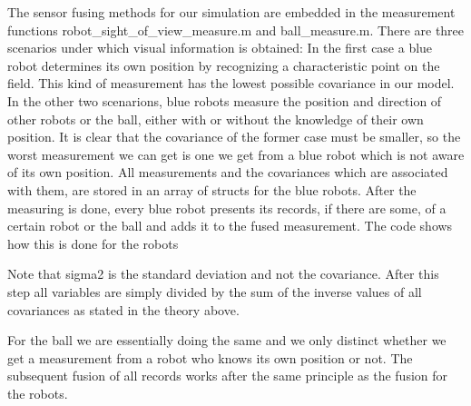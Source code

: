 The sensor fusing methods for our simulation are embedded in the measurement functions {\selectfont robot\_sight\_of\_view\_measure.m} and {\selectfont ball\_measure.m}. There are three scenarios under which visual information is obtained: In the first case a blue robot determines its own position by recognizing a characteristic point on the field. This kind of measurement has the lowest possible covariance in our model. In the other two scenarions, blue robots measure the position and direction of other robots or the ball, either with or without the knowledge of their own position. It is clear that the covariance of the former case must be smaller, so the worst measurement we can get is one we get from a blue robot which is not aware of its own position. All measurements and the covariances which are associated with them, are stored in an array of structs for the blue robots. After the measuring is done, every blue robot presents its records, if there are some, of a certain robot or the ball and adds it to the fused measurement. The code shows how this is done for the robots

%

\parskip 20pt

Note that {\selectfont sigma2} is the standard deviation and not the covariance. After this step all variables are simply divided by the sum of the inverse values of all covariances as stated in the theory above. 

%


For the ball we are essentially doing the same and we only distinct whether we get a measurement from a robot who knows its own position or not. The subsequent fusion of all records works after the same principle as the fusion for the robots.




